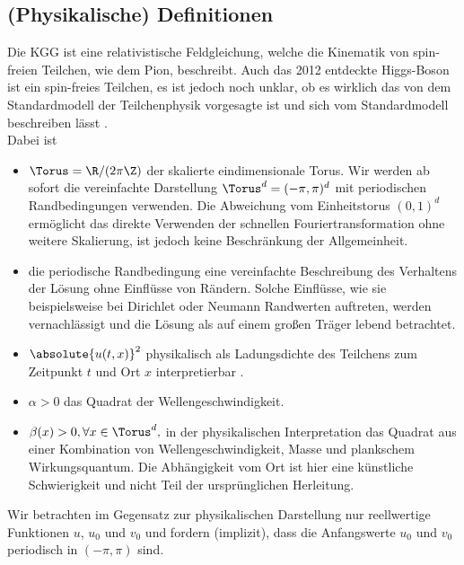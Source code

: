\subsection{(Physikalische) Definitionen}
Die KGG ist eine relativistische Feldgleichung, welche die Kinematik von spin-freien Teilchen, wie dem Pion, beschreibt. Auch das 2012 entdeckte Higgs-Boson ist ein spin-freies Teilchen, es ist jedoch noch unklar, ob es wirklich das von dem Standardmodell der Teilchenphysik vorgesagte ist und sich vom Standardmodell beschreiben lässt \autocite{cern2016}.\\
Dabei ist
\begin{itemize}
\item $\Torus=\R/(2\pi\Z)$ der skalierte eindimensionale Torus. Wir werden ab sofort die vereinfachte Darstellung $\Torus^d=(-\pi,\pi)^d$ mit periodischen Randbedingungen verwenden. Die Abweichung vom Einheitstorus $(0,1)^d$ ermöglicht das direkte Verwenden der schnellen Fouriertransformation ohne weitere Skalierung, ist jedoch keine Beschränkung der Allgemeinheit. 
\item die periodische Randbedingung eine vereinfachte Beschreibung des Verhaltens der Lösung ohne Einflüsse von Rändern. Solche Einflüsse, wie sie beispielsweise bei Dirichlet oder Neumann Randwerten auftreten, werden vernachlässigt und die Lösung als auf einem großen Träger lebend betrachtet.
\item $\absolute{u(t,x)}^2$ physikalisch als Ladungsdichte des Teilchens zum Zeitpunkt $t$ und Ort $x$ interpretierbar \autocite{kleingordon2016}. 
\item $\alpha>0$ das Quadrat der Wellengeschwindigkeit.
\item $\beta(x)>0, \forall x\in \Torus^d,$ in der physikalischen Interpretation das Quadrat aus einer Kombination von Wellengeschwindigkeit, Masse und plankschem Wirkungsquantum. Die Abhängigkeit vom Ort ist hier eine künstliche Schwierigkeit und nicht Teil der ursprünglichen Herleitung.
\end{itemize}
Wir betrachten im Gegensatz zur physikalischen Darstellung nur reellwertige Funktionen $u$, $u_0$ und $v_0$ und fordern (implizit), dass die Anfangswerte $u_0$ und $v_0$ periodisch in $(-\pi,\pi)$ sind. 

